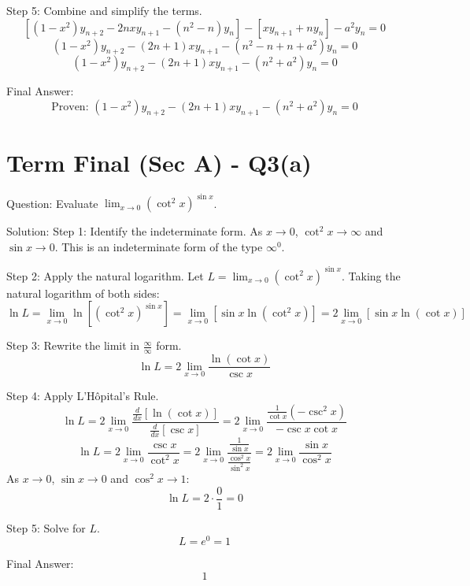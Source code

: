 \documentclass[11pt, a4paper]{article}
\begin{document}
Step 5: Combine and simplify the terms.
$$\left[ (1-x^2)y_{n+2} - 2nxy_{n+1} - (n^2-n)y_n \right] - \left[ x y_{n+1} + n y_n \right] - a^2 y_n = 0$$
$$(1-x^2)y_{n+2} - (2n+1)xy_{n+1} - (n^2 - n + n + a^2)y_n = 0$$
$$(1-x^2)y_{n+2} - (2n+1)xy_{n+1} - (n^2 + a^2)y_n = 0$$

Final Answer:
$$
\boxed{\text{Proven: } (1-x^2)y_{n+2} - (2n+1)xy_{n+1} - (n^2+a^2)y_n = 0}
$$


\section*{Term Final (Sec A) - Q3(a)}
Question:
Evaluate $\lim_{x \to 0} (\cot^2 x)^{\sin x}$.

Solution:
Step 1: Identify the indeterminate form.
As $x \to 0$, $\cot^2 x \to \infty$ and $\sin x \to 0$. This is an indeterminate form of the type $\infty^0$.

Step 2: Apply the natural logarithm.
Let $L = \lim_{x \to 0} (\cot^2 x)^{\sin x}$.
Taking the natural logarithm of both sides:
$$\ln L = \lim_{x \to 0} \ln\left[ (\cot^2 x)^{\sin x} \right] = \lim_{x \to 0} \left[ \sin x \ln(\cot^2 x) \right] = 2 \lim_{x \to 0} \left[ \sin x \ln(\cot x) \right]$$

Step 3: Rewrite the limit in $\frac{\infty}{\infty}$ form.
$$\ln L = 2 \lim_{x \to 0} \frac{\ln(\cot x)}{\csc x}$$

Step 4: Apply L'H\^opital's Rule.
$$\ln L = 2 \lim_{x \to 0} \frac{\frac{d}{dx}[\ln(\cot x)]}{\frac{d}{dx}[\csc x]} = 2 \lim_{x \to 0} \frac{\frac{1}{\cot x} (-\csc^2 x)}{-\csc x \cot x}$$
$$\ln L = 2 \lim_{x \to 0} \frac{\csc x}{\cot^2 x} = 2 \lim_{x \to 0} \frac{\frac{1}{\sin x}}{\frac{\cos^2 x}{\sin^2 x}} = 2 \lim_{x \to 0} \frac{\sin x}{\cos^2 x}$$
As $x \to 0$, $\sin x \to 0$ and $\cos^2 x \to 1$:
$$\ln L = 2 \cdot \frac{0}{1} = 0$$

Step 5: Solve for $L$.
$$L = e^0 = 1$$

Final Answer:
$$
\boxed{1}
$$

\end{document}
